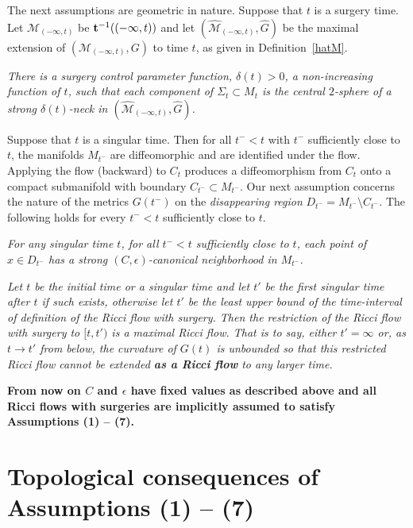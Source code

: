\bigskip

The next assumptions are geometric in nature.
Suppose that $t$ is a surgery time. Let ${\mathcal M}_{(-\infty,t)}$ be ${\bf t}^{-1}((-\infty,t))$
and let $(\widehat {\mathcal M}_{(-\infty,t)},\widehat G)$ be the maximal extension of
$({\mathcal M}_{(-\infty,t)},G)$ to time $t$, as given in Definition~\ref{hatM}.

 {\em There is a surgery control parameter
function,
$\delta(t)>0$, a non-increasing function of
$t$, such that each component of $\Sigma_{t}\subset M_{t}$ is the
central $2$-sphere of a strong $\delta(t)$-neck in $(\widehat{\mathcal
M}_{(-\infty,t)},\widehat G)$.}


\bigskip

Suppose that $t$ is a singular time. Then for all $t^-<t$ with $t^-$
sufficiently close to $t$,  the manifolds $M_{t^-}$ are diffeomorphic and are
identified under the flow. Applying the flow (backward) to $C_{t}$ produces a
diffeomorphism from $C_{t}$  onto a compact submanifold with boundary
$C_{t^-}\subset M_{t^-}$. Our next assumption concerns the nature of the
metrics $G(t^-)$ on the {\em disappearing region}
$D_{t^-}=M_{t^-}\setminus C_{t^-}$. The following holds for
every $t^-<t$ sufficiently close to $t$.


 {\em For any
singular time $t$, for all $t^-<t$ sufficiently close to $t$, each point of
$x\in D_{t^-}$ has a strong $(C,\epsilon)$-canonical neighborhood in
$M_{t^-}$.}


 {\em Let $t$ be
the initial time or a singular time and let $t'$ be the first
singular time after $t$ if such exists, otherwise let $t'$ be the
least upper bound of the time-interval of definition of the Ricci
flow with surgery. Then the restriction of the Ricci flow with
surgery to $[t,t')$ is a maximal Ricci flow. That is to say, either
$t'=\infty$ or, as $t\rightarrow t'$ from below, the curvature of $G(t)$
is unbounded so that this restricted Ricci flow cannot be extended
{\bf as a Ricci flow} to any larger time.}

\bigskip

{\bf From now on $C$ and $\epsilon$ have fixed values as described
above and all Ricci flows with surgeries are implicitly assumed to
satisfy Assumptions (1) -- (7).}




\section{Topological consequences of  Assumptions (1) -- (7)}

